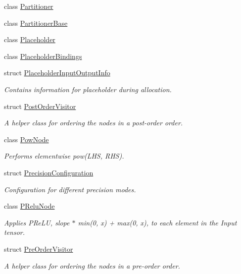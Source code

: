 \begin{DoxyCompactItemize}
class \hyperlink{classglow_1_1_partitioner}{Partitioner}
\item 
class \hyperlink{classglow_1_1_partitioner_base}{Partitioner\+Base}
\item 
class \hyperlink{classglow_1_1_placeholder}{Placeholder}
\item 
class \hyperlink{classglow_1_1_placeholder_bindings}{Placeholder\+Bindings}
\item 
struct \hyperlink{structglow_1_1_placeholder_input_output_info}{Placeholder\+Input\+Output\+Info}
\begin{DoxyCompactList}\small\item\em Contains information for placeholder during allocation. \end{DoxyCompactList}\item 
struct \hyperlink{structglow_1_1_post_order_visitor}{Post\+Order\+Visitor}
\begin{DoxyCompactList}\small\item\em A helper class for ordering the nodes in a post-\/order order. \end{DoxyCompactList}\item 
class \hyperlink{classglow_1_1_pow_node}{Pow\+Node}
\begin{DoxyCompactList}\small\item\em Performs elementwise pow(\+L\+H\+S, R\+H\+S). \end{DoxyCompactList}\item 
struct \hyperlink{structglow_1_1_precision_configuration}{Precision\+Configuration}
\begin{DoxyCompactList}\small\item\em Configuration for different precision modes. \end{DoxyCompactList}\item 
class \hyperlink{classglow_1_1_p_relu_node}{P\+Relu\+Node}
\begin{DoxyCompactList}\small\item\em Applies P\+Re\+LU, slope $\ast$ min(0, x) + max(0, x), to each element in the Input tensor. \end{DoxyCompactList}\item 
struct \hyperlink{structglow_1_1_pre_order_visitor}{Pre\+Order\+Visitor}
\begin{DoxyCompactList}\small\item\em A helper class for ordering the nodes in a pre-\/order order. \end{DoxyCompactList}\item 

\end{DoxyCompactItemize}
